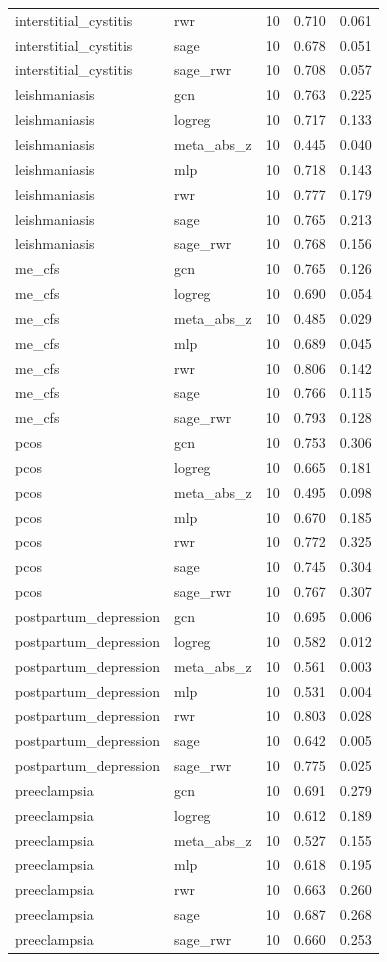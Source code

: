 \begin{longtable}{llrrr}
interstitial\_cystitis & rwr & 10 & 0.710 & 0.061\\
interstitial\_cystitis & sage & 10 & 0.678 & 0.051\\
interstitial\_cystitis & sage\_rwr & 10 & 0.708 & 0.057\\
leishmaniasis & gcn & 10 & 0.763 & 0.225\\
leishmaniasis & logreg & 10 & 0.717 & 0.133\\
leishmaniasis & meta\_abs\_z & 10 & 0.445 & 0.040\\
leishmaniasis & mlp & 10 & 0.718 & 0.143\\
leishmaniasis & rwr & 10 & 0.777 & 0.179\\
leishmaniasis & sage & 10 & 0.765 & 0.213\\
leishmaniasis & sage\_rwr & 10 & 0.768 & 0.156\\
me\_cfs & gcn & 10 & 0.765 & 0.126\\
me\_cfs & logreg & 10 & 0.690 & 0.054\\
me\_cfs & meta\_abs\_z & 10 & 0.485 & 0.029\\
me\_cfs & mlp & 10 & 0.689 & 0.045\\
me\_cfs & rwr & 10 & 0.806 & 0.142\\
me\_cfs & sage & 10 & 0.766 & 0.115\\
me\_cfs & sage\_rwr & 10 & 0.793 & 0.128\\
pcos & gcn & 10 & 0.753 & 0.306\\
pcos & logreg & 10 & 0.665 & 0.181\\
pcos & meta\_abs\_z & 10 & 0.495 & 0.098\\
pcos & mlp & 10 & 0.670 & 0.185\\
pcos & rwr & 10 & 0.772 & 0.325\\
pcos & sage & 10 & 0.745 & 0.304\\
pcos & sage\_rwr & 10 & 0.767 & 0.307\\
postpartum\_depression & gcn & 10 & 0.695 & 0.006\\
postpartum\_depression & logreg & 10 & 0.582 & 0.012\\
postpartum\_depression & meta\_abs\_z & 10 & 0.561 & 0.003\\
postpartum\_depression & mlp & 10 & 0.531 & 0.004\\
postpartum\_depression & rwr & 10 & 0.803 & 0.028\\
postpartum\_depression & sage & 10 & 0.642 & 0.005\\
postpartum\_depression & sage\_rwr & 10 & 0.775 & 0.025\\
preeclampsia & gcn & 10 & 0.691 & 0.279\\
preeclampsia & logreg & 10 & 0.612 & 0.189\\
preeclampsia & meta\_abs\_z & 10 & 0.527 & 0.155\\
preeclampsia & mlp & 10 & 0.618 & 0.195\\
preeclampsia & rwr & 10 & 0.663 & 0.260\\
preeclampsia & sage & 10 & 0.687 & 0.268\\
preeclampsia & sage\_rwr & 10 & 0.660 & 0.253\\
\hline\end{longtable}
